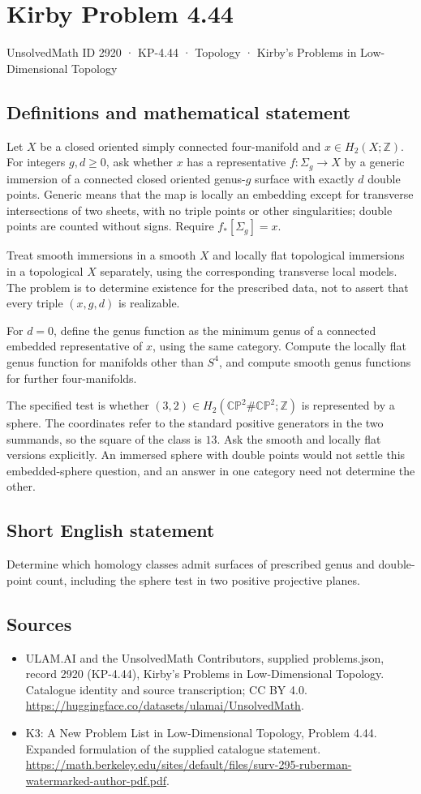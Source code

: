 \documentclass[11pt,a4paper]{article}
\begin{document}
\section*{Kirby Problem 4.44}\label{2920}
{\small UnsolvedMath ID 2920 · KP-4.44 · Topology · Kirby's Problems in Low-Dimensional Topology}
\subsection{Definitions and mathematical statement}
Let $X$ be a closed oriented simply connected four-manifold and $x\in H_2(X;\mathbb Z)$. For integers $g,d\ge0$, ask whether $x$ has a representative $f:\Sigma_g\to X$ by a generic immersion of a connected closed oriented genus-$g$ surface with exactly $d$ double points. Generic means that the map is locally an embedding except for transverse intersections of two sheets, with no triple points or other singularities; double points are counted without signs. Require $f_*[\Sigma_g]=x$.

Treat smooth immersions in a smooth $X$ and locally flat topological immersions in a topological $X$ separately, using the corresponding transverse local models. The problem is to determine existence for the prescribed data, not to assert that every triple $(x,g,d)$ is realizable.

For $d=0$, define the genus function as the minimum genus of a connected embedded representative of $x$, using the same category. Compute the locally flat genus function for manifolds other than $S^4$, and compute smooth genus functions for further four-manifolds.

The specified test is whether $(3,2)\in H_2(\mathbb{CP}^2\#\mathbb{CP}^2;\mathbb Z)$ is represented by a sphere. The coordinates refer to the standard positive generators in the two summands, so the square of the class is $13$. Ask the smooth and locally flat versions explicitly. An immersed sphere with double points would not settle this embedded-sphere question, and an answer in one category need not determine the other.
\subsection{Short English statement}
Determine which homology classes admit surfaces of prescribed genus and double-point count, including the sphere test in two positive projective planes.
\subsection{Sources}
\begin{itemize}
\item[S1] ULAM.AI and the UnsolvedMath Contributors, supplied problems.json, record 2920 (KP-4.44), Kirby's Problems in Low-Dimensional Topology. Catalogue identity and source transcription; CC BY 4.0.
\url{https://huggingface.co/datasets/ulamai/UnsolvedMath}.
\item[S2] K3: A New Problem List in Low-Dimensional Topology, Problem 4.44. Expanded formulation of the supplied catalogue statement.
\url{https://math.berkeley.edu/sites/default/files/surv-295-ruberman-watermarked-author-pdf.pdf}.
\end{itemize}
\end{document}
